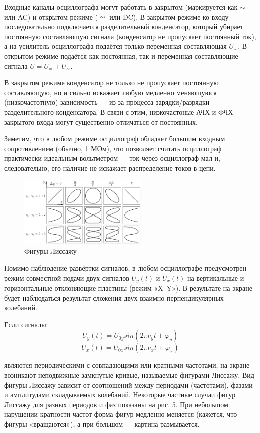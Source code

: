 \documentclass[a4paper]{article}
\begin{document}
Входные каналы осциллографа могут работать в закрытом (маркируется как $\sim$ или AC) и открытом режиме ($\simeq$ или DC). В закрытом режиме ко входу последовательно подключается разделительный конденсатор, который убирает постоянную составляющую сигнала (конденсатор не пропускает постоянный ток), а на усилитель осциллографа подаётся только переменная составляющая $U_{\sim}$. В открытом режиме подаётся как постоянная, так и переменная составляющие сигнала $U = U_{=} + U_{\sim}$.\par 
В закрытом режиме конденсатор не только не пропускает постоянную составляющую, но и сильно искажает любую медленно меняющуюся (низкочастотную) зависимость — из-за процесса зарядки/разрядки разделительного конденсатора. В связи с этим, низкочастоные АЧХ и ФЧХ закрытого входа могут существенно отличаться
от постоянных.\par
Заметим, что в любом режиме осциллограф обладает большим входным сопротивлением (обычно, 1 МОм), что позволяет считать осциллограф практически идеальным вольтметром — ток через осциллограф мал и, следовательно, его наличие не искажает распределение токов в цепи.

\begin{figure}
\centering
\includegraphics[width=0.55\textwidth]{5.png}
\caption{Фигуры Лиссажу}
\end{figure}

Помимо наблюдение развёртки сигналов, в любом осциллографе предусмотрен режим совместной подачи двух сигналов $U_{y}(t)$ и $U_{x}(t)$ на вертикальные и горизонтальные отклоняющие пластины (режим «X–Y»). В результате на экране будет наблюдаться результат сложения двух взаимно перпендикулярных колебаний.

Если сигналы:
\[U_{y}(t) = U_{0y}sin(2\pi\nu_{y}t + \varphi_{y})\]
\[U_{x}(t) = U_{0x}sin(2\pi\nu_{x}t + \varphi_{x})\]

являются периодическими с совпадающими или кратными частотами, на экране возникают неподвижные замкнутые кривые, называемые фигурами Лиссажу. Вид фигуры Лиссажу зависит от соотношений между периодами (частотами), фазами и амплитудами складываемых колебаний. Некоторые частные случаи фигур Лиссажу для разных периодов и фаз показаны на рис. 5. При небольшом нарушении кратности частот форма фигур медленно меняется (кажется, что фигуры «вращаются»), а при большом — картина размывается.
\end{document}
